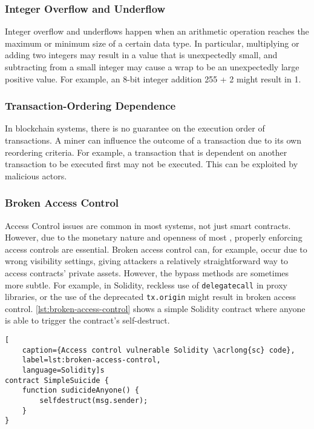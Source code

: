 \subsubsection{Integer Overflow and Underflow}
Integer overflow and underflows happen when an arithmetic operation reaches the maximum or minimum size of a certain data type. In particular, multiplying or adding two integers may result in a value that is unexpectedly small, and subtracting from a small integer may cause a wrap to be an unexpectedly large positive value. For example, an 8-bit integer addition 255 + 2 might result in 1.

\subsubsection{Transaction-Ordering Dependence}
In blockchain systems, there is no guarantee on the execution order of transactions. A miner can influence the outcome of a transaction due to its own reordering criteria. For example, a transaction that is dependent on another transaction to be executed first may not be executed. This can be exploited by malicious actors. 

\subsubsection{Broken Access Control}
Access Control issues are common in most systems, not just smart contracts. However, due to the monetary nature and openness of most , properly enforcing access controls are essential. Broken access control can, for example, occur due to wrong visibility settings, giving attackers a relatively straightforward way to access contracts' private assets. However, the bypass methods are sometimes more subtle. For example, in Solidity, reckless use of \lstinline[language=Solidity]!delegatecall! in proxy libraries, or the use of the deprecated \lstinline[language=Solidity]!tx.origin! might result in broken access control. \cref{lst:broken-access-control} shows a simple Solidity contract where anyone is able to trigger the contract's self-destruct.

\begin{lstlisting}[
    caption={Access control vulnerable Solidity \acrlong{sc} code},
    label=lst:broken-access-control,
    language=Solidity]s
contract SimpleSuicide {
    function sudicideAnyone() {
        selfdestruct(msg.sender);
    }
}
\end{lstlisting}

